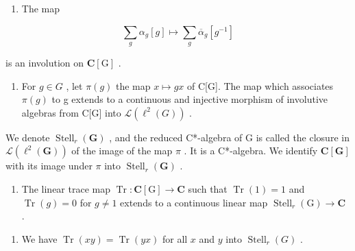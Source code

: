 \begin{enumerate}
\def\labelenumi{\alph{enumi})}
\tightlist
\item
  The map
\end{enumerate}

\[
\sum_ {g} \alpha_ {g} [ g ] \mapsto \sum_ {g} \overline {{\alpha}} _ {g} [ g ^ {- 1} ]
\]

is an involution on \(\mathbf{C}[\mathrm{G}]\) .

\begin{enumerate}
\def\labelenumi{\alph{enumi})}
\setcounter{enumi}{1}
\tightlist
\item
  For \(g \in G\) , let \(\pi(g)\) the map \(x \mapsto gx\) of C{[}G{]}. The map which associates \(\pi(g)\) to g extends to a continuous and injective morphism of involutive algebras from C{[}G{]} into \(\mathcal{L}(\ell^{2}(G))\) .
\end{enumerate}

We denote \(\operatorname{Stell}_{r}(\mathbf{G})\) , and the reduced C*-algebra of G is called the closure in \(\mathcal{L}(\ell^{2}(\mathbf{G}))\) of the image of the map \(\pi\) . It is a C*-algebra. We identify \(\mathbf{C}[\mathbf{G}]\) with its image under \(\pi\) into \(\operatorname{Stell}_{r}(\mathbf{G})\) .

\begin{enumerate}
\def\labelenumi{\alph{enumi})}
\setcounter{enumi}{2}
\tightlist
\item
  The linear trace map \(\operatorname{Tr} \colon \mathbf{C}[\mathrm{G}] \to \mathbf{C}\) such that \(\operatorname{Tr}(1) = 1\) and \(\operatorname{Tr}(g) = 0\) for \(g \neq 1\) extends to a continuous linear map \(\operatorname{Stell}_r(\mathrm{G}) \to \mathbf{C}\) .
\end{enumerate}

\begin{enumerate}
\def\labelenumi{\alph{enumi})}
\setcounter{enumi}{3}
\tightlist
\item
  We have \(\operatorname{Tr}(xy) = \operatorname{Tr}(yx)\) for all \(x\) and \(y\) into \(\operatorname{Stell}_r(G) \) .
\end{enumerate}

